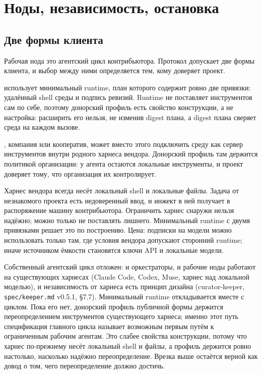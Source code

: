 \chapter{Ноды, независимость, остановка}

\section{Две формы клиента}

Рабочая нода это агентский цикл контрибьютора. Протокол допускает две формы клиента, и выбор между ними определяется тем, кому доверяет проект.

 использует минимальный runtime, план которого содержит ровно две привязки: удалённый shell среды и подпись ревизий. Runtime не поставляет инструментов сам по себе, поэтому донорский профиль есть свойство конструкции, а не настройка: расширить его нельзя, не изменив digest плана, а digest плана сверяет среда на каждом вызове.

, компания или кооператив, может вместо этого подключить среду как сервер инструментов внутри родного харнеса вендора. Донорский профиль там держится политикой организации: у агента остаются локальные инструменты, и проект доверяет тому, что организация их контролирует.

\begin{whybox}
Харнес вендора всегда несёт локальный shell и локальные файлы. Задача от незнакомого проекта есть недоверенный ввод, и инжект в ней получает в распоряжение машину контрибьютора. Ограничить харнес снаружи нельзя надёжно; можно только не поставлять лишнего. Минимальный runtime с двумя привязками решает это по построению. Цена: подписки на модели можно использовать только там, где условия вендора допускают сторонний runtime; иначе источником ёмкости становятся ключи API и локальные модели.
\end{whybox}

 Собственный агентский цикл отложен: и оркестраторы, и рабочие ноды работают на существующих харнесах (Claude Code, Codex, Muse, харнес над локальной моделью), и независимость от харнеса есть принцип дизайна (curator-keeper, \texttt{spec/keeper.md} v0.5.1, §7.7). Минимальный runtime откладывается вместе с циклом. Пока его нет, донорский профиль публичной формы держится переопределением инструментов существующего харнеса; именно этот путь спецификация главного цикла называет возможным первым путём к ограниченным рабочим агентам. Это слабее свойства конструкции, потому что харнес по-прежнему несёт локальный shell и файлы, а профиль держится ровно настолько, насколько надёжно переопределение. Врезка выше остаётся верной как довод о том, чего переопределение должно достичь.

